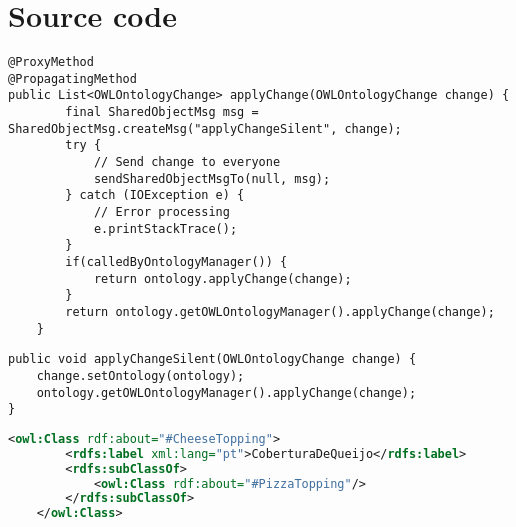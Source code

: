 \chapter{Source code}
\begin{lstlisting}[caption={The \emph{applyChanges} method of
	the OWLReplicaOntology implementation},label=applyChange]
@ProxyMethod
@PropagatingMethod
public List<OWLOntologyChange> applyChange(OWLOntologyChange change) {
		final SharedObjectMsg msg = SharedObjectMsg.createMsg("applyChangeSilent", change);
		try {
			// Send change to everyone
			sendSharedObjectMsgTo(null, msg);
		} catch (IOException e) {
			// Error processing
			e.printStackTrace();
		}
		if(calledByOntologyManager()) {
			return ontology.applyChange(change);
		}
		return ontology.getOWLOntologyManager().applyChange(change);
	}
\end{lstlisting}

\begin{lstlisting}[caption={The \emph{applyChangesSilent} method of
	the OWLReplicaOntology implementation},label=applyChangesSilent]
		public void applyChangeSilent(OWLOntologyChange change) {
	change.setOntology(ontology);
	ontology.getOWLOntologyManager().applyChange(change);
}
\end{lstlisting}

\begin{lstlisting}[caption={Example of OWL axioms},label=owlclass,language=XML]
	<owl:Class rdf:about="#CheeseTopping">
		<rdfs:label xml:lang="pt">CoberturaDeQueijo</rdfs:label>
		<rdfs:subClassOf>
			<owl:Class rdf:about="#PizzaTopping"/>
		</rdfs:subClassOf>
	</owl:Class>
\end{lstlisting}




%












